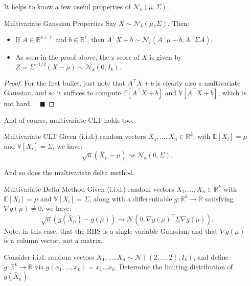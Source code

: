 It helps to know a few useful properties of $\mathcal{N}_k(\mu, \Sigma)$.

\begin{theorem}{Multivariate Gaussian Properties}
    Say $X \sim \mathcal{N}_k(\mu, \Sigma)$.  Then:
    \begin{itemize}
        \item If $A \in \mathbb{R}^{k \times \ell}$ and $b \in \mathbb{R}^{\ell}$,
        then $A^{\top}X + b \sim \mathcal{N}_{\ell}(A^{\top}\mu + b, A^{\top}\Sigma A)$.
        \item As seen in the proof above, the z-score of $X$ is
        given by $Z = \Sigma^{-1/2}(X - \mu) \sim \mathcal{N}_k(0, I_k)$.
    \end{itemize}
\end{theorem}

\begin{proof}
    For the first bullet, just note that $A^{\top}X + b$ is clearly also a multivariate Gaussian,
    and so it suffices to compute $\mathbb{E}[A^{\top}X + b]$ and $\mathbb{V}[A^{\top}X + b]$,
    which is not hard. ~ $\blacksquare$
\end{proof}

And of course, multivariate CLT holds too.

\begin{theorem}{Multivariate CLT}
    Given (i.i.d.) random vectors $X_1, \dots, X_n \in \mathbb{R}^k$,
    with $\mathbb{E}[X_i] = \mu$ and $\mathbb{V}[X_i] = \Sigma$, we have:
    \[ \sqrt{n}(\bar{X}_n - \mu) \rightsquigarrow \mathcal{N}_k(0, \Sigma). \]
\end{theorem}

And so does the multivariate delta method.

\begin{theorem}{Multivariate Delta Method}
    Given (i.i.d.) random vectors $X_1, \dots, X_n \in \mathbb{R}^k$ with
    $\mathbb{E}[X_i] = \mu$ and $\mathbb{V}[X_i] = \Sigma$, along with
    a differentiable $g: \mathbb{R}^k \to \mathbb{R}$ satisfying $\nabla g(\mu) \neq 0$, we have:
    \[ \sqrt{n}\left(g(\bar{X}_n) - g(\mu)\right) \rightsquigarrow
    \mathcal{N}\left(0, \nabla g(\mu)^{\top} \Sigma \nabla g(\mu)\right). \]
    Note, in this case, that the RHS is a single-variable Gaussian,
    and that $\nabla g(\mu)$ is a column vector, not a matrix.
\end{theorem}

\begin{problem}
    Consider i.i.d. random vectors $X_1, \dots, X_n \sim \mathcal{N}((2, \dots, 2), I_k)$,
    and define $g: \mathbb{R}^k \to \mathbb{R}$ via $g(x_1, \dots, x_k) = x_1\dots x_k$.
    Determine the limiting distribution of $g(\bar{X}_n)$.
\end{problem}

